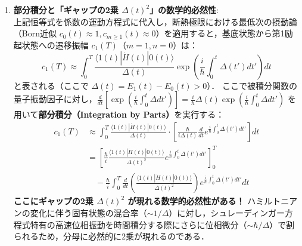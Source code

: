 \documentclass[11pt,a4paper,oneside,openany]{ltjsbook}
\theoremstyle{definition}
\theoremstyle{plain}
\theoremstyle{remark}
\newcommand{\mel}[3]{\langle#1|#2|#3\rangle}
\begin{document}
\begin{insightbox}
\begin{enumerate}[label=\textbf{Step \arabic* :}, leftmargin=*]
    \item \textbf{部分積分と「ギャップの2乗 $\Delta(t)^2$」の数学的必然性}:\\
    上記恒等式を係数の運動方程式に代入し，断熱極限における最低次の摂動論（Born近似 $c_0(t) \approx 1, c_{m\ge 1}(t) \approx 0$）を適用すると，基底状態から第1励起状態への遷移振幅 $c_1(T)$（$m=1, n=0$）は：
    \begin{equation}
        c_1(T) \approx \int_0^T \frac{\mel{1(t)}{\dot{H}(t)}{0(t)}}{\Delta(t)} \exp\left(\frac{i}{\hbar}\int_0^t \Delta(t') dt'\right) dt
    \end{equation}
    と表される（ここで $\Delta(t) = E_1(t) - E_0(t) > 0$）．
    ここで被積分関数の量子振動因子に対し，$\frac{d}{dt}\left[\exp\left(\frac{i}{\hbar}\int_0^t \Delta dt'\right)\right] = \frac{i}{\hbar}\Delta(t) \exp\left(\frac{i}{\hbar}\int_0^t \Delta dt'\right)$ を用いて\textbf{部分積分（Integration by Parts）}を実行する：
    \begin{align}
        c_1(T) &\approx \int_0^T \frac{\mel{1(t)}{\dot{H}(t)}{0(t)}}{\Delta(t)} \cdot \left[ \frac{\hbar}{i\Delta(t)} \frac{d}{dt} e^{\frac{i}{\hbar}\int_0^t \Delta(t') dt'} \right] dt \nonumber \\
        &= \left[ \frac{\hbar}{i} \frac{\mel{1(t)}{\dot{H}(t)}{0(t)}}{\Delta(t)^2} e^{\frac{i}{\hbar}\int_0^t \Delta(t') dt'} \right]_0^T \nonumber \\
        &\quad - \frac{\hbar}{i}\int_0^T \frac{d}{dt}\left( \frac{\mel{1(t)}{\dot{H}(t)}{0(t)}}{\Delta(t)^2} \right) e^{\frac{i}{\hbar}\int_0^t \Delta(t') dt'} dt
    \end{align}
    \textbf{ここにギャップの2乗 $\Delta(t)^2$ が現れる数学的必然性がある！}
    ハミルトニアンの変化に伴う固有状態の混合率（$\sim 1/\Delta$）に対し，シュレーディンガー方程式特有の高速位相振動を時間積分する際にさらに位相微分（$\sim \hbar/\Delta$）で割られるため，分母に必然的に2乗が現れるのである．


\end{enumerate}
\end{insightbox}
\end{document}
